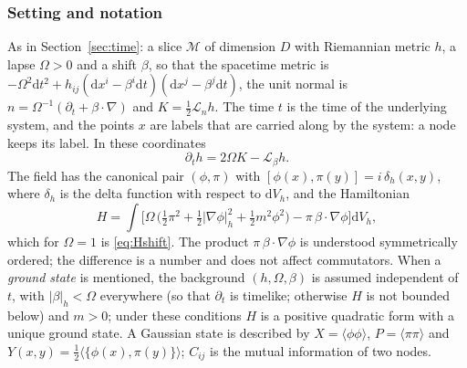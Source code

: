 \documentclass[11pt,a4paper]{article}
\theoremstyle{stmt}
\theoremstyle{defn}
\theoremstyle{rmk}
\numberwithin{equation}{section}
\newcommand{\Lie}{\mathcal{L}}
\newcommand{\M}{\mathcal{M}}
\newcommand{\dd}{\mathrm{d}}
\begin{document}
{\subsubsection{Setting and notation}

As in Section~\ref{sec:time}: a slice $\M$ of dimension $D$ with Riemannian metric $h$, a lapse $\Omega>0$ and a shift $\beta$, so that the spacetime metric is $-\Omega^2\dd t^2+h_{ij}(\dd x^i-\beta^i\dd t)(\dd x^j-\beta^j\dd t)$, the unit normal is $n=\Omega^{-1}(\partial_t+\beta\cdot\nabla)$ and $K=\tfrac12\Lie_nh$. The time $t$ is the time of the underlying system, and the points $x$ are labels that are carried along by the system: a node keeps its label. In these coordinates
\begin{equation}\label{eq:hdot}
\partial_th=2\Omega K-\Lie_\beta h .
\end{equation}
The field has the canonical pair $(\phi,\pi)$ with $[\phi(x),\pi(y)]=i\,\delta_h(x,y)$, where $\delta_h$ is the delta function with respect to $\dd V_h$, and the Hamiltonian
\begin{equation}\label{eq:H}
H=\int\Big[\Omega\,\big(\tfrac12\pi^2+\tfrac12|\nabla\phi|_h^2+\tfrac12m^2\phi^2\big)-\pi\,\beta\cdot\nabla\phi\Big]\dd V_h ,
\end{equation}
which for $\Omega=1$ is \eqref{eq:Hshift}. The product $\pi\,\beta\cdot\nabla\phi$ is understood symmetrically ordered; the difference is a number and does not affect commutators. When a \emph{ground state} is mentioned, the background $(h,\Omega,\beta)$ is assumed independent of $t$, with $|\beta|_h<\Omega$ everywhere (so that $\partial_t$ is timelike; otherwise $H$ is not bounded below) and $m>0$; under these conditions $H$ is a positive quadratic form with a unique ground state. A Gaussian state is described by $X=\langle\phi\phi\rangle$, $P=\langle\pi\pi\rangle$ and $Y(x,y)=\tfrac12\langle\{\phi(x),\pi(y)\}\rangle$; $C_{ij}$ is the mutual information of two nodes.

}
\end{document}
